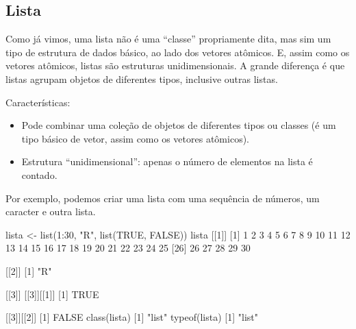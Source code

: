 \documentclass[
  10pt,
  a4paper]{book}
\newenvironment{Shaded}{\begin{snugshade}}{\end{snugshade}}
\newcommand{\ConstantTok}[1]{\textcolor[rgb]{0.00,0.00,0.00}{#1}}
\newcommand{\DecValTok}[1]{\textcolor[rgb]{0.00,0.00,0.81}{#1}}
\newcommand{\FunctionTok}[1]{\textcolor[rgb]{0.00,0.00,0.00}{#1}}
\newcommand{\NormalTok}[1]{#1}
\newcommand{\OtherTok}[1]{\textcolor[rgb]{0.56,0.35,0.01}{#1}}
\newcommand{\SpecialCharTok}[1]{\textcolor[rgb]{0.00,0.00,0.00}{#1}}
\newcommand{\StringTok}[1]{\textcolor[rgb]{0.31,0.60,0.02}{#1}}
\providecommand{\tightlist}{%
  \setlength{\itemsep}{0pt}\setlength{\parskip}{0pt}}
\begin{document}
\hypertarget{lista}{%
\subsection{Lista}\label{lista}}

Como já vimos, uma lista não é uma ``classe'' propriamente dita, mas sim
um tipo de estrutura de dados básico, ao lado dos vetores atômicos. E,
assim como os vetores atômicos, listas são estruturas unidimensionais. A
grande diferença é que listas agrupam objetos de diferentes tipos,
inclusive outras listas.

Características:

\begin{itemize}
\tightlist
\item
  Pode combinar uma coleção de objetos de diferentes tipos ou classes (é
  um tipo básico de vetor, assim como os vetores atômicos).
\item
  Estrutura ``unidimensional'': apenas o número de elementos na lista é
  contado.
\end{itemize}

Por exemplo, podemos criar uma lista com uma sequência de números, um
caracter e outra lista.

\begin{Shaded}
\begin{Highlighting}[]
\NormalTok{lista }\OtherTok{\textless{}{-}} \FunctionTok{list}\NormalTok{(}\DecValTok{1}\SpecialCharTok{:}\DecValTok{30}\NormalTok{, }\StringTok{"R"}\NormalTok{, }\FunctionTok{list}\NormalTok{(}\ConstantTok{TRUE}\NormalTok{, }\ConstantTok{FALSE}\NormalTok{))}
\NormalTok{lista}
\NormalTok{[[}\DecValTok{1}\NormalTok{]]}
\NormalTok{ [}\DecValTok{1}\NormalTok{]  }\DecValTok{1}  \DecValTok{2}  \DecValTok{3}  \DecValTok{4}  \DecValTok{5}  \DecValTok{6}  \DecValTok{7}  \DecValTok{8}  \DecValTok{9} \DecValTok{10} \DecValTok{11} \DecValTok{12} \DecValTok{13} \DecValTok{14} \DecValTok{15} \DecValTok{16} \DecValTok{17} \DecValTok{18} \DecValTok{19} \DecValTok{20} \DecValTok{21} \DecValTok{22} \DecValTok{23} \DecValTok{24} \DecValTok{25}
\NormalTok{[}\DecValTok{26}\NormalTok{] }\DecValTok{26} \DecValTok{27} \DecValTok{28} \DecValTok{29} \DecValTok{30}

\NormalTok{[[}\DecValTok{2}\NormalTok{]]}
\NormalTok{[}\DecValTok{1}\NormalTok{] }\StringTok{"R"}

\NormalTok{[[}\DecValTok{3}\NormalTok{]]}
\NormalTok{[[}\DecValTok{3}\NormalTok{]][[}\DecValTok{1}\NormalTok{]]}
\NormalTok{[}\DecValTok{1}\NormalTok{] }\ConstantTok{TRUE}

\NormalTok{[[}\DecValTok{3}\NormalTok{]][[}\DecValTok{2}\NormalTok{]]}
\NormalTok{[}\DecValTok{1}\NormalTok{] }\ConstantTok{FALSE}
\FunctionTok{class}\NormalTok{(lista)}
\NormalTok{[}\DecValTok{1}\NormalTok{] }\StringTok{"list"}
\FunctionTok{typeof}\NormalTok{(lista)}
\NormalTok{[}\DecValTok{1}\NormalTok{] }\StringTok{"list"}
\end{Highlighting}
\end{Shaded}
\end{document}
